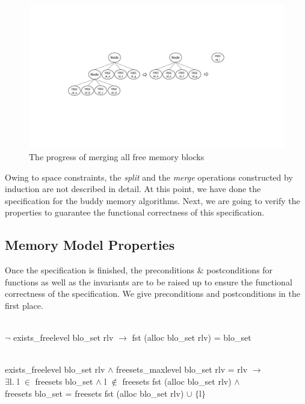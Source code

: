 \begin{figure}
\centering
\includegraphics[width=1\textwidth]{fig2.pdf}
\caption{The progress of merging all free memory blocks}
\label{fig2}
\end{figure}

Owing to space constraints, the \emph{split} and the \emph{merge} operations constructed by induction are not described in detail. At this point, we have done the specification for the buddy memory algorithms. Next, we are going to verify the properties to guarantee the functional correctness of this specification.


\subsection{Memory Model Properties}
Once the specification is finished, the preconditions $\&$ postconditions for functions as well as the invariants are to be raised up to ensure the functional correctness of the specification. We give preconditions and postconditions in the first place.

\begin{definition}  \\
$\neg$ exists\_freelevel blo\_set rlv $\longrightarrow$ fst (alloc blo\_set rlv) = blo\_set
\label{pp1}
\end{definition}

\begin{definition}  \\
exists\_freelevel blo\_set rlv $\wedge$ freesets\_maxlevel blo\_set rlv = rlv $\longrightarrow$ \\
\phantom{x} \hspace{10pt} $\exists$l. l $\in$ freesets blo\_set $\wedge$ l $\notin$ freesets fst (alloc blo\_set rlv) $\wedge$ \\
\phantom{x} \hspace{10pt} freesets blo\_set = freesets fst (alloc blo\_set rlv) $\cup$ $\lbrace$l$\rbrace$
\label{pp2}
\end{definition}

